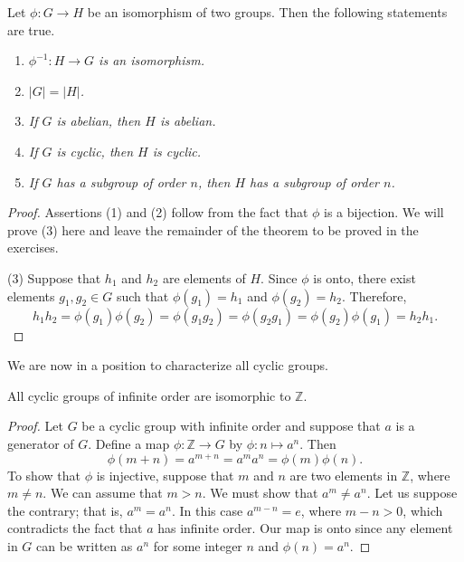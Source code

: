 \begin{theorem}\label{isomorph_theorem_1}
Let $\phi : G \rightarrow H$ be an isomorphism of two groups.  Then the following statements are true. 
\begin{enumerate}
 
\rm \item \it
$\phi^{-1} : H \rightarrow G$ is an isomorphism. 

\rm \item \it
$|G| = |H|$. 

\rm \item \it
If $G$ is abelian, then $H$ is abelian. 

\rm \item \it
If $G$ is cyclic, then $H$ is cyclic. 

\rm \item \it
If $G$ has a subgroup of order $n$, then $H$ has a subgroup of order $n$.
 
\end{enumerate}
\end{theorem}

\begin{proof}
Assertions (1) and (2) follow from the fact that $\phi$ is a bijection.  We will prove (3) here and leave the remainder of the theorem to be proved in the exercises.
 
(3)
Suppose that $h_1$ and $h_2$ are elements of $H$.  Since $\phi$ is onto, there exist elements $g_1, g_2 \in G$ such that $\phi(g_1) = h_1$ and $\phi(g_2) = h_2$.  Therefore, 
\[
h_1 h_2 = \phi(g_1) \phi(g_2) =  \phi(g_1 g_2) = \phi(g_2 g_1) = \phi(g_2) \phi(g_1) = h_2 h_1. 
\]
\end{proof}

\medskip

We are now in a position to characterize all cyclic groups.

\begin{theorem}\label{isomorph_theorem_2}
All cyclic groups of infinite order are isomorphic to ${\mathbb Z}$.
\end{theorem}

\begin{proof}
Let $G$ be a cyclic group with infinite order and suppose that $a$ is a generator of $G$.  Define a map $\phi : {\mathbb Z} \rightarrow  G$ by $\phi : n \mapsto a^n$. Then 
\[
\phi( m+n ) = a^{m+n} = a^m a^n = \phi( m ) \phi( n ).
\]
To show that $\phi$ is injective, suppose that $m$ and $n$ are two elements in ${\mathbb Z}$, where $m \neq n$.  We can assume that $m > n$.  We must show that $a^m \neq a^n$. Let us suppose the contrary; that is, $a^m = a^n$. In this case $a^{m - n} = e$, where $m - n>0$, which contradicts the fact that $a$ has infinite order.  Our map is onto since any element in $G$ can be written as $a^n$ for some integer $n$ and $\phi(n) = a^n$.   
\end{proof}

